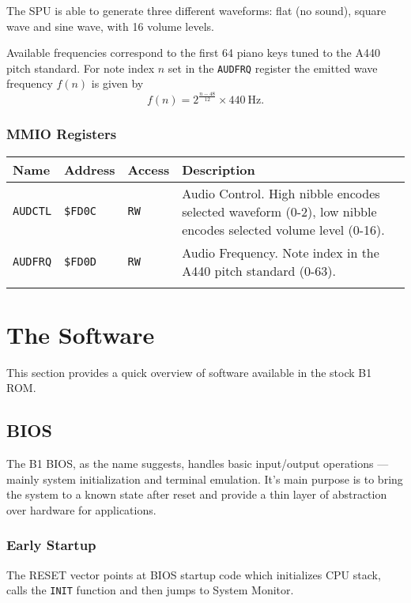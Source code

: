 \documentclass[a4paper,10pt,oneside]{article}
\begin{document}
The SPU is able to generate three different waveforms: flat (no sound), square wave and sine wave, with 16 volume levels.

Available frequencies correspond to the first 64 piano keys tuned to the A440 pitch standard. For note index $n$ set in the \texttt{AUDFRQ} register the emitted wave frequency $f(n)$ is given by
\begin{equation*}
  f(n) = 2^{\frac{n-48}{12}} \times \SI{440}{\hertz}.
\end{equation*}

\newpage
\subsubsection*{MMIO Registers}
\begin{tabularx}{\textwidth}{l | l | l | X }
  \textbf{Name} & \textbf{Address} & \textbf{Access} & \textbf{Description} \\ \hline
  \texttt{AUDCTL} & \texttt{\$FD0C} & \texttt{RW} &
  Audio Control. High nibble encodes selected waveform (0-2), low nibble encodes selected volume level (0-16). \\ \hline
  \texttt{AUDFRQ} & \texttt{\$FD0D} & \texttt{RW} &
  Audio Frequency. Note index in the A440 pitch standard (0-63). \\
  \caption{SPU registers}
\end{tabularx}

\section{The Software}
This section provides a quick overview of software available in the stock B1 ROM.

\subsection{BIOS}
The B1 BIOS, as the name suggests, handles basic input/output operations --- mainly system initialization and terminal emulation. It's main purpose is to bring the system to a known state after reset and provide a thin layer of abstraction over hardware for applications.

\subsubsection*{Early Startup}
The RESET vector points at BIOS startup code which initializes CPU stack, calls the \texttt{INIT} function and then jumps to System Monitor.
\end{document}
